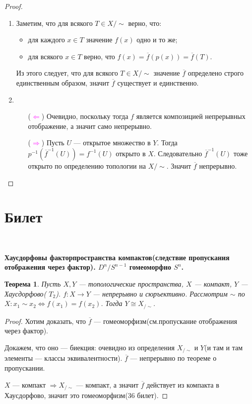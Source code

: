 \documentclass[a4paper,100pt]{article}
\theoremstyle{indented}
\newtheorem{theorem}{Теорема}
\begin{document}
\begin{proof}\ 
    \begin{enumerate}
        \item Заметим, что для всякого $T \in X/{\sim}$ верно, что:
        \begin{itemize}
            \item для каждого $x \in T$ значение $f(x)$ одно и то же;
            \item для всякого $x \in T$ верно, что $f(x) = \overline{f}(p(x)) = \overline{f}(T)$.
        \end{itemize}
        Из этого следует, что для всякого $T \in X/{\sim}$ значение $\overline{f}$ определено строго единственным образом, значит $\overline{f}$ существует и единственно.
        
        \item
        \begin{itemize}
            \item[(\textcolor{magenta}{$\Leftarrow$})] Очевидно, поскольку тогда $f$ является композицией непрерывных отображение, а значит само непрерывно.
            \item[(\textcolor{magenta}{$\Rightarrow$})] Пусть $U$ --- открытое множество в $Y$. Тогда $p^{-1}(\overline{f}^{-1}(U)) = f^{-1}(U)$ открыто в $X$. Следовательно $\overline{f}^{-1}(U)$ тоже открыто по определению топологии на $X/{\sim}$. Значит $\overline{f}$ непрерывно.
        \end{itemize}
    \end{enumerate}
\end{proof}


\section{Билет} \

\medskip

\textbf{Хаусдорфовы факторпространства компактов(следствие пропускания отображения через фактор). $D^n/S^{n-1}$ гомеоморфно $S^n$.}\\
     
     \begin{theorem}
         Пусть $X, Y$ --- топологические пространства, $X$ --- компакт, $Y$ --- Хаусдорфово( $T_2$). $f:X \rightarrow Y$ --- непрерывно и сюръективно. Рассмотрим $\sim$ по $X: x_1 \sim x_2 \iff f(x_1) = f(x_2)$. Тогда $Y \cong X_{/\sim}$.
     \end{theorem}
     
     \begin{proof}
         Хотим доказать, что $\overline f$ --- гомеоморфизм(см.пропускание отображения через фактор). 
         
         Докажем, что оно --- биекция: очевидно из определения $X_{/\sim}$ и $Y$(и там и там элементы --- классы эквивалентности). $\overline f$ --- непрерывно по теореме о пропускании.
         
         $X$ --- компакт $\Rightarrow X_{/\sim}$ --- компакт, а значит $\overline f$ действует из компакта в Хаусдорфово, значит это гомеоморфизм(36 билет).   
     \end{proof}
     
\end{document}
